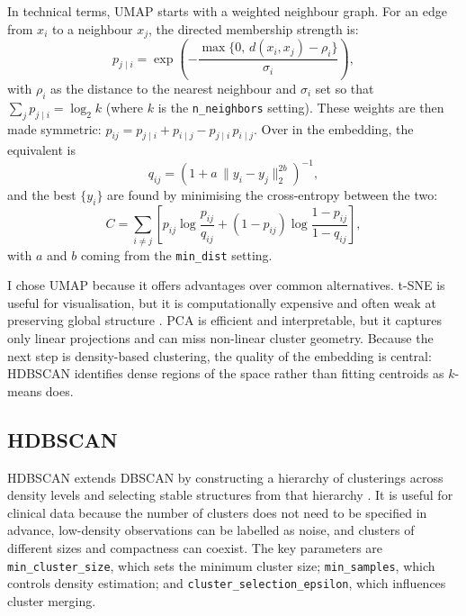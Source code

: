In technical terms, UMAP starts with a weighted neighbour graph. For an edge from $x_i$ to a neighbour $x_j$, the directed membership strength is:
\begin{equation}\label{eq:umap_p}
p_{j\mid i}=\exp\!\left(-\frac{\max\{0,\,d(x_i,x_j)-\rho_i\}}{\sigma_i}\right),
\end{equation}
with $\rho_i$ as the distance to the nearest neighbour and $\sigma_i$ set so that $\sum_{j}p_{j\mid i}=\log_2 k$ (where $k$ is the \texttt{n\_neighbors} setting). These weights are then made symmetric: $p_{ij}=p_{j\mid i}+p_{i\mid j}-p_{j\mid i}\,p_{i\mid j}$. Over in the embedding, the equivalent is
\begin{equation}\label{eq:umap_q}
q_{ij}=\left(1+a\,\lVert y_i-y_j\rVert_2^{2b}\right)^{-1},
\end{equation}
and the best $\{y_i\}$ are found by minimising the cross-entropy between the two:
\begin{equation}\label{eq:umap_ce}
C=\sum_{i\ne j}\left[p_{ij}\log\frac{p_{ij}}{q_{ij}}+(1-p_{ij})\log\frac{1-p_{ij}}{1-q_{ij}}\right],
\end{equation}
with $a$ and $b$ coming from the \texttt{min\_dist} setting.

I chose UMAP because it offers advantages over common alternatives. t-SNE is useful for visualisation, but it is computationally expensive and often weak at preserving global structure \parencite{vandermaaten2008tsne}. PCA is efficient and interpretable, but it captures only linear projections and can miss non-linear cluster geometry. Because the next step is density-based clustering, the quality of the embedding is central: HDBSCAN identifies dense regions of the space rather than fitting centroids as $k$-means does.

\subsection{HDBSCAN}

HDBSCAN extends DBSCAN by constructing a hierarchy of clusterings across density levels and selecting stable structures from that hierarchy \parencite{campello2013density}. It is useful for clinical data because the number of clusters does not need to be specified in advance, low-density observations can be labelled as noise, and clusters of different sizes and compactness can coexist. The key parameters are \texttt{min\_cluster\_size}, which sets the minimum cluster size; \texttt{min\_samples}, which controls density estimation; and \texttt{cluster\_selection\_epsilon}, which influences cluster merging.

